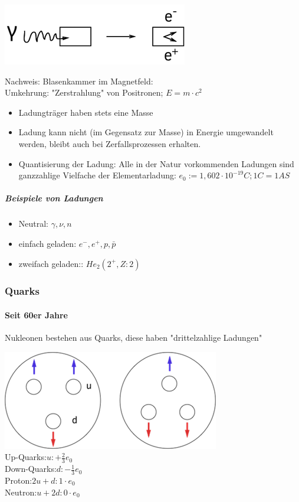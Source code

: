 \documentclass[11pt]{article}
\begin{document}
				\includegraphics{skizzen/14/14_1B2}
				
				\newpage
				
				\noindent Nachweis: Blasenkammer im Magnetfeld:  \hfill \\
				Umkehrung: "Zerstrahlung" von Positronen; $E=m\cdot c^2$
				\begin{itemize}
					\item Ladungtr\"{a}ger haben stets eine Masse
					\item Ladung kann nicht (im Gegensatz zur Masse) in Energie umgewandelt werden, bleibt auch bei Zerfallsprozessen erhalten.
					\item Quantisierung der Ladung: Alle in der Natur vorkommenden Ladungen sind ganzzahlige Vielfache der Elementarladung: $e_0:=1,602\cdot10^{-19}C; 1C=1AS$
				\end{itemize}
				\subparagraph{Beispiele von Ladungen}
				\begin{itemize}
					\item Neutral: $\gamma, \nu, n$
					\item einfach geladen: $e^-,e^+,p, \bar{p}$
					\item zweifach geladen:: $He_2(2^+,Z:2)$
				\end{itemize}	
				

\subsubsection{ Quarks }	
\paragraph{Seit 60er Jahre}
Nukleonen bestehen aus Quarks, diese haben "drittelzahlige Ladungen"

\includegraphics{skizzen/14/14_1B5}
\\
Up-Quarks:$u:+\frac{2}{3	}e_0$
\\
Down-Quarks:$d:-\frac{1}{3}e_0$
\\
Proton:$2u+d: 1\cdot e_0$
\\
Neutron:$u+2d: 0\cdot e_0$
\\
\end{document}
